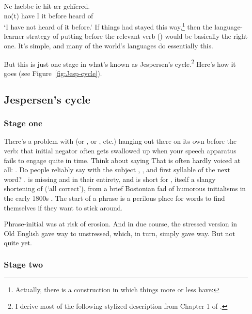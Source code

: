 \ea \label{ex:ne-habbe}
    \gll Ne hæbbe ic hit ær gehīered. \\ no(t) have I it before {heard of} \\
    \trans `I have not heard of it before.'
\z
If things had stayed this way,\footnote{Actually, there is a construction in which things more or less have: } then the language-learner strategy of putting  before the relevant verb () would be basically the right one. It's simple, and many of the world's languages do essentially this.

But this is just one stage in what's known as Jespersen's cycle.\footnote{I derive most of the following stylized description from Chapter 1 of \textcite{Jespersen1917}.} Here's how it goes (see Figure~\ref{fig:Jesp-cycle}).

\subsection{Jespersen's cycle}

\subsubsection*{Stage one}
There's a problem with  (or , or , etc.) hanging out there on its own before the verb: that initial negator often gets swallowed up when your speech apparatus fails to engage quite in time. Think about saying  That  is often hardly voiced at all: . Do people reliably say  with the subject , , and first syllable of the next word? .  is missing  and  in their entirety, and  is short for , itself a slangy shortening of  (`all correct'), from a brief Bostonian fad of humorous initialisms in the early 1800s \citep{OK}. The start of a phrase is a perilous place for words to find themselves if they want to stick around.

Phrase-initial  was at risk of erosion. And in due course, the stressed version in Old English gave way to unstressed, which, in turn, simply gave way. But not quite yet.

\subsubsection*{Stage two}


